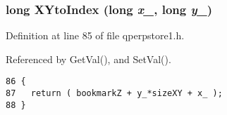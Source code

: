 \subsubsection{\setlength{\rightskip}{0pt plus 5cm}long XYtoIndex (long {\em x\_\-}, long {\em y\_\-})}\label{qperpstore1_8h_4bbf7878725b1e6aed6a1244db0dd50f}




Definition at line 85 of file qperpstore1.h.

Referenced by GetVal(), and SetVal().

\begin{Code}\begin{verbatim}86 {
87   return ( bookmarkZ + y_*sizeXY + x_ );
88 }
\end{verbatim}
\end{Code}


